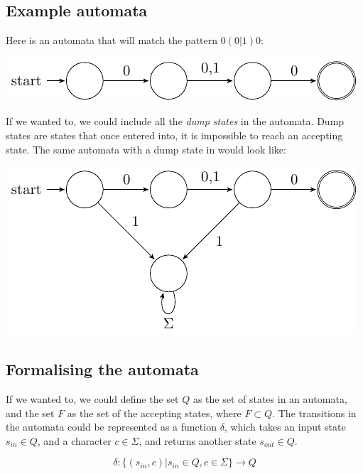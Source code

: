\subsection{Example automata}

Here is an automata that will match the pattern $0(0|1)0$:

\begin{center}
  \includegraphics{automata/1.pdf}
\end{center}

If we wanted to, we could include all the {\it dump states} in the automata.
Dump states are states that once entered into, it is impossible to reach an
accepting state. The same automata with a dump state in would look like:

\begin{center}
  \includegraphics{automata/2.pdf}
\end{center}

\subsection{Formalising the automata}

If we wanted to, we could define the set $Q$ as the set of states in an
automata, and the set $F$ as the set of the accepting states, where $F \subset
Q$. The transitions in the automata could be represented as a function $\delta$,
which takes an input state $s_{in} \in Q$, and a character $c \in \Sigma$, and
returns another state $s_{out} \in Q$.

\[
  \delta:\{(s_{in},c)| s_{in} \in Q, c \in \Sigma\} \rightarrow Q
\]


